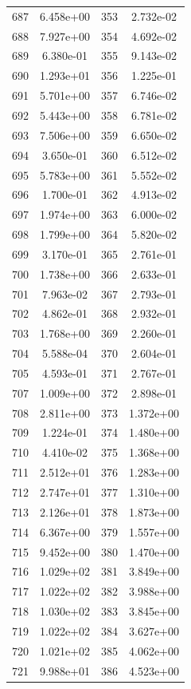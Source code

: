 \documentclass[12pt]{article}
\begin{document}
\begin{longtable}{@{}cccc@{}}
687 & 6.458e+00 & 353 & 2.732e-02 \\
688 & 7.927e+00 & 354 & 4.692e-02 \\
689 & 6.380e-01 & 355 & 9.143e-02 \\
690 & 1.293e+01 & 356 & 1.225e-01 \\
691 & 5.701e+00 & 357 & 6.746e-02 \\
692 & 5.443e+00 & 358 & 6.781e-02 \\
693 & 7.506e+00 & 359 & 6.650e-02 \\
694 & 3.650e-01 & 360 & 6.512e-02 \\
695 & 5.783e+00 & 361 & 5.552e-02 \\
696 & 1.700e-01 & 362 & 4.913e-02 \\
697 & 1.974e+00 & 363 & 6.000e-02 \\
698 & 1.799e+00 & 364 & 5.820e-02 \\
699 & 3.170e-01 & 365 & 2.761e-01 \\
700 & 1.738e+00 & 366 & 2.633e-01 \\
701 & 7.963e-02 & 367 & 2.793e-01 \\
702 & 4.862e-01 & 368 & 2.932e-01 \\
703 & 1.768e+00 & 369 & 2.260e-01 \\
704 & 5.588e-04 & 370 & 2.604e-01 \\
705 & 4.593e-01 & 371 & 2.767e-01 \\
707 & 1.009e+00 & 372 & 2.898e-01 \\
708 & 2.811e+00 & 373 & 1.372e+00 \\
709 & 1.224e-01 & 374 & 1.480e+00 \\
710 & 4.410e-02 & 375 & 1.368e+00 \\
711 & 2.512e+01 & 376 & 1.283e+00 \\
712 & 2.747e+01 & 377 & 1.310e+00 \\
713 & 2.126e+01 & 378 & 1.873e+00 \\
714 & 6.367e+00 & 379 & 1.557e+00 \\
715 & 9.452e+00 & 380 & 1.470e+00 \\
716 & 1.029e+02 & 381 & 3.849e+00 \\
717 & 1.022e+02 & 382 & 3.988e+00 \\
718 & 1.030e+02 & 383 & 3.845e+00 \\
719 & 1.022e+02 & 384 & 3.627e+00 \\
720 & 1.021e+02 & 385 & 4.062e+00 \\
721 & 9.988e+01 & 386 & 4.523e+00 \\

\end{longtable}
\end{document}
